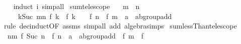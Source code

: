 \begin{isabellebody}
%
\isadelimproof
\ \ %
\endisadelimproof
%
\isatagproof
{}\isamarkupfalse%
\ {\isacharparenleft}{\kern0pt}induct\ i{\isacharparenright}{\kern0pt}\ simp{\isacharunderscore}{\kern0pt}all%
\endisatagproof
{\isafoldproof}%
%
\isadelimproof
\isanewline
%
\endisadelimproof
\isanewline
{}\isamarkupfalse%
\ sum{\isacharunderscore}{\kern0pt}telescope{\isacharprime}{\kern0pt}{\isacharprime}{\kern0pt}{\isacharcolon}{\kern0pt}\isanewline
\ \ \ {\isachardoublequoteopen}m\ {\isasymle}\ n{\isachardoublequoteclose}\isanewline
\ \ \ \ \ {\isachardoublequoteopen}{\isacharparenleft}{\kern0pt}{\isasymSum}k{\isasymin}{\isacharbraceleft}{\kern0pt}Suc\ m{\isachardot}{\kern0pt}{\isachardot}{\kern0pt}n{\isacharbraceright}{\kern0pt}{\isachardot}{\kern0pt}\ f\ k\ {\isacharminus}{\kern0pt}\ f\ {\isacharparenleft}{\kern0pt}k\ {\isacharminus}{\kern0pt}\ {}{\isacharparenright}{\kern0pt}{\isacharparenright}{\kern0pt}\ {\isacharequal}{\kern0pt}\ f\ n\ {\isacharminus}{\kern0pt}\ {\isacharparenleft}{\kern0pt}f\ m\ {\isacharcolon}{\kern0pt}{\isacharcolon}{\kern0pt}\ {\isacharprime}{\kern0pt}a\ {\isacharcolon}{\kern0pt}{\isacharcolon}{\kern0pt}\ ab{\isacharunderscore}{\kern0pt}group{\isacharunderscore}{\kern0pt}add{\isacharparenright}{\kern0pt}{\isachardoublequoteclose}\isanewline
%
\isadelimproof
\ \ %
\endisadelimproof
%
\isatagproof
{}\isamarkupfalse%
\ {\isacharparenleft}{\kern0pt}rule\ dec{\isacharunderscore}{\kern0pt}induct{\isacharbrackleft}{\kern0pt}OF\ assms{\isacharbrackright}{\kern0pt}{\isacharparenright}{\kern0pt}\ {\isacharparenleft}{\kern0pt}simp{\isacharunderscore}{\kern0pt}all\ add{\isacharcolon}{\kern0pt}\ algebra{\isacharunderscore}{\kern0pt}simps{\isacharparenright}{\kern0pt}%
\endisatagproof
{\isafoldproof}%
%
\isadelimproof
\isanewline
%
\endisadelimproof
\isanewline
{}\isamarkupfalse%
\ sum{\isacharunderscore}{\kern0pt}lessThan{\isacharunderscore}{\kern0pt}telescope{\isacharcolon}{\kern0pt}\isanewline
\ \ {\isachardoublequoteopen}{\isacharparenleft}{\kern0pt}{\isasymSum}n{\isacharless}{\kern0pt}m{\isachardot}{\kern0pt}\ f\ {\isacharparenleft}{\kern0pt}Suc\ n{\isacharparenright}{\kern0pt}\ {\isacharminus}{\kern0pt}\ f\ n\ {\isacharcolon}{\kern0pt}{\isacharcolon}{\kern0pt}\ {\isacharprime}{\kern0pt}a\ {\isacharcolon}{\kern0pt}{\isacharcolon}{\kern0pt}\ ab{\isacharunderscore}{\kern0pt}group{\isacharunderscore}{\kern0pt}add{\isacharparenright}{\kern0pt}\ {\isacharequal}{\kern0pt}\ f\ m\ {\isacharminus}{\kern0pt}\ f\ {}{\isachardoublequoteclose}\isanewline

\end{isabellebody}
